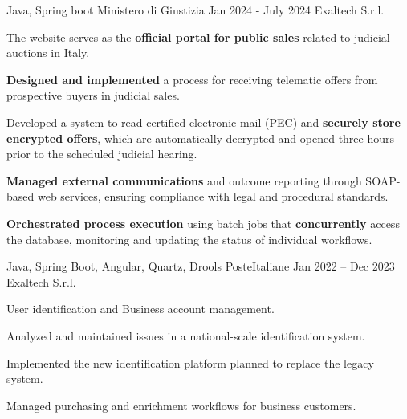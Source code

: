 \begin{cventries}
  \cventry
    {Java, Spring boot} %
    {Ministero di Giustizia} %
    {Jan 2024 - July 2024} %
    {Exaltech S.r.l.} %
    {
      \begin{cvitems} %
        \item {The website serves as the \textbf{official portal for public sales} related to judicial auctions in Italy.}
        \item {\textbf{Designed and implemented} a process for receiving telematic offers from prospective buyers in judicial sales.}
        \item {Developed a system to read certified electronic mail (PEC) and \textbf{securely store encrypted offers}, which are automatically decrypted and opened three hours prior to the scheduled judicial hearing.}  
        \item {\textbf{Managed external communications} and outcome reporting through SOAP-based web services, ensuring compliance with legal and procedural standards.}  
        \item {\textbf{Orchestrated process execution} using batch jobs that \textbf{concurrently} access the database, monitoring and updating the status of individual workflows.}  
      \end{cvitems}
    }

  \cventry
    {Java, Spring Boot, Angular, Quartz, Drools} %
    {PosteItaliane} %
    {Jan 2022 – Dec 2023} %
    {Exaltech S.r.l.} %
    {
      \begin{cvitems} %
        \item {User identification and Business account management.}
        \item {Analyzed and maintained issues in a national-scale identification system.}
        \item {Implemented the new identification platform planned to replace the legacy system.}  
        \item {Managed purchasing and enrichment workflows for business customers.}  
      \end{cvitems}
    }

\end{cventries}
